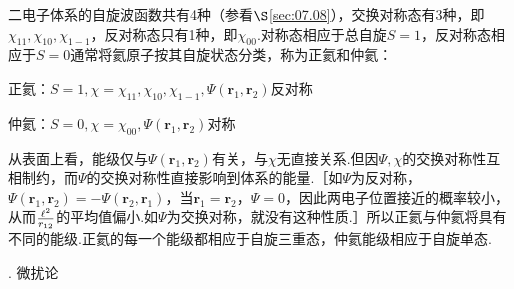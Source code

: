二电子体系的自旋波函数共有4种（参看$\S$\ref{sec:07.08}），交换对称态有3种，即$\chi_{11},\chi_{10},\chi_{1-1}$，反对称态只有1种，即$\chi_{00}$.对称态相应于总自旋$S=1$，反对称态相应于$S=0$通常将氦原子按其自旋状态分类，称为正氦和仲氦：

正氦：$S=1,\chi=\chi_{11},\chi_{10},\chi_{1-1},\varPsi(\boldsymbol{r}_{1},\boldsymbol{r}_{2})$反对称

仲氦：$S=0,\chi=\chi_{00},\varPsi(\boldsymbol{r}_{1},\boldsymbol{r}_{2})$对称

\noindent 从表面上看，能级仅与$\varPsi(\boldsymbol{r}_{1},\boldsymbol{r}_{2})$有关，与$\chi$无直接关系.但因$\varPsi,\chi$的交换对称性互相制约，而$\varPsi$的交换对称性直接影响到体系的能量.［如$\varPsi$为反对称，$\varPsi(\boldsymbol{r}_{1},\boldsymbol{r}_{2})=-\varPsi(\boldsymbol{r}_{2},\boldsymbol{r}_{1})$，当$\boldsymbol{r}_{1}=\boldsymbol{r}_{2}$，$\varPsi=0$，因此两电子位置接近的概率较小，从而$\frac{\ell^{2}}{r_{12}}$的平均值偏小.如$\varPsi$为交换对称，就没有这种性质.］所以正氦与仲氦将具有不同的能级.正氦的每一个能级都相应于自旋三重态，仲氦能级相应于自旋单态.

{. 微扰论} 

